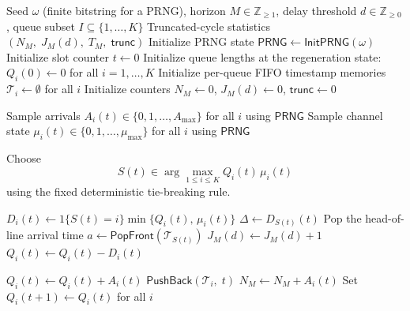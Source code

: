 \documentclass[11pt]{article}
\begin{document}
\begin{algorithm}[h]
\scriptsize
\setlength{\baselineskip}{0.9\baselineskip}
\caption{\textsc{Regeneration cycle for the MaxWeight wireless model$(\omega;M,d,I)$}}
\label{alg:wireless-one-cycle}
\begin{algorithmic}[1]
\Require Seed $\omega$ (finite bitstring for a PRNG), horizon $M\in\mathbb{Z}_{\ge 1}$, delay threshold $d\in\mathbb{Z}_{\ge 0}$, queue subset $I\subseteq\{1,\dots,K\}$
\Ensure Truncated-cycle statistics $(N_M,\;J_M(d),\;T_M,\;\mathsf{trunc})$
\State Initialize PRNG state $\mathsf{PRNG}\gets \mathsf{InitPRNG}(\omega)$
\State Initialize slot counter $t\gets 0$
\State Initialize queue lengths at the regeneration state: $Q_i(0)\gets 0$ for all $i=1,\dots,K$
\State Initialize per-queue FIFO timestamp memories $\mathcal{T}_i\gets \emptyset$ for all $i$ 
\State Initialize counters $N_M\gets 0$, $J_M(d)\gets 0$, $\mathsf{trunc}\gets 0$

    \State Sample arrivals $A_i(t)\in\{0,1,\dots,A_{\max}\}$ for all $i$ using $\mathsf{PRNG}$
    \State Sample channel state $\mu_i(t)\in\{0,1,\dots,\mu_{\max}\}$ for all $i$ using $\mathsf{PRNG}$

    \State Choose
    \[
      S(t)\in \arg\max_{1\le i\le K} Q_i(t)\,\mu_i(t)
    \]
    using the fixed deterministic tie-breaking rule.

        \State $D_i(t)\gets {1}\{S(t)=i\}\min\{Q_i(t),\,\mu_i(t)\}$
    \EndFor
    \State $\Delta \gets D_{S(t)}(t)$ 
        \State Pop the head-of-line arrival time $a \gets \mathsf{PopFront}(\mathcal{T}_{S(t)})$
        \State {}
            \State $J_M(d)\gets J_M(d)+1$
        \EndIf
    \EndFor
        \State $Q_i(t)\gets Q_i(t) - D_i(t)$
    \EndFor

        \State $Q_i(t)\gets Q_i(t) + A_i(t)$
            \State $\mathsf{PushBack}(\mathcal{T}_i,\; t)$ 
        \EndFor
            \State $N_M \gets N_M + A_i(t)$
        \EndIf
    \EndFor
    \State Set $Q_i(t+1)\gets Q_i(t)$ for all $i$ 


\end{algorithmic}
\end{algorithm}
\end{document}
